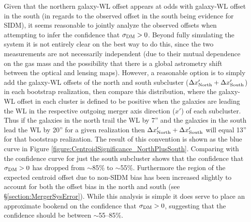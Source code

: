 Given that the northern galaxy-WL offset appears at odds with galaxy-WL offset in the south (in regards to the observed offset in the south being evidence for SIDM), it seems reasonable to jointly analyze the observed offsets when attempting to infer the confidence that $\sigma_{\rm DM}>0$. 
Beyond fully simulating the system it is not entirely clear on the best way to do this, since the two measurements are not necessarily independent (due to their mutual dependence on the gas mass and the possibility that there is a global astrometry shift between the optical and lensing maps). 
However, a reasonable option is to simply add the galaxy-WL offsets of the north and south subcluster ($\Delta x'_{\rm North}+\Delta x'_{\rm South}$) in each bootstrap realization, then compare this distribution, where the galaxy-WL offset in each cluster is defined to be positive when the galaxies are leading the WL in the respective outgoing merger axis direction ($x'$) of each subcluster.
Thus if the galaxies in the north trail the WL by 7'' and the galaxies in the south lead the WL by 20'' for a given realization then $\Delta x'_{\rm North}+\Delta x'_{\rm South}$ will equal 13'' for that bootstrap realization.
The result of this convention is shown as the blue curve in Figure \ref{figure:CentroidSignificance_NorthPlusSouth}.
Comparing with the confidence curve for just the south subcluster shows that the confidence that $\sigma_{\rm DM}>0$ has dropped from $\sim$85\% to $\sim$55\%.
Furthermore the region of the expected centroid offset due to non-SIDM bias has been increased slightly to account for both the offset bias in the north and south (see \S\ref{section:MergerSysError}).
While this analysis is simple it does serve to place an approximate bookend on the confidence that $\sigma_{\rm DM}>0$, suggesting that the confidence should be between $\sim$55--85\%.

